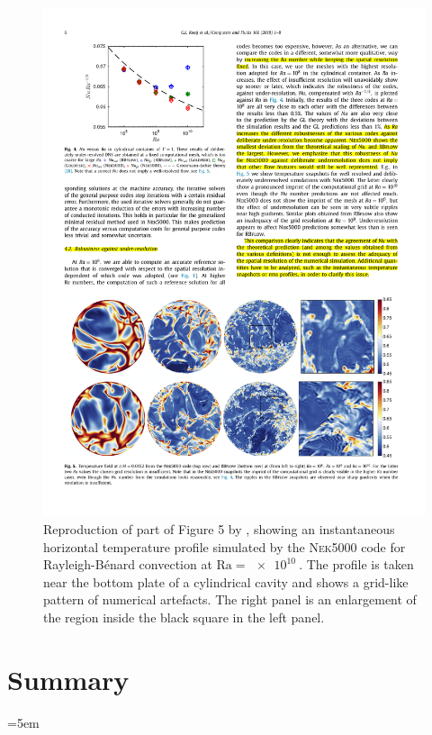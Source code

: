 \documentclass[titlepage,twoside]{article}
\numberwithin{equation}{section}
\newcommand{\rayleigh}{\ensuremath{\mathrm{Ra}}}
\newcommand{\rb}{Rayleigh-B\'{e}nard}
\begin{document}
\begin{figure}[ht]
    \centering
    \includegraphics[width=\linewidth]{figures/kooij2018_artefacts.pdf}
    \caption{
        Reproduction of part of Figure 5 by \textcite{kooij2018}, showing an
        instantaneous horizontal temperature profile simulated by the
        \textsc{Nek}5000 code for \rb{} convection at $\rayleigh =
        \SI{e10}{}$. The profile is taken near the bottom plate of a
        cylindrical cavity and shows a grid-like pattern of numerical
        artefacts. The right panel is an enlargement of the region inside
        the black square in the left panel.
    }
    \label{fig:kooij2018_artefacts}
\end{figure}

\clearpage
\section{Summary}

\clearpage
\emergencystretch=5em
\printbibliography
\end{document}
